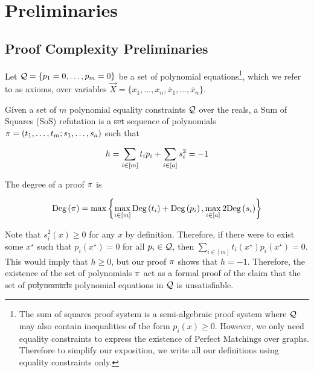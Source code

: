 \documentclass[11pt]{article}
\providecommand{\DIFadd}[1]{\textcolor{shin-ryoku}{#1}}%
\providecommand{\DIFdel}[1]{\textcolor{verylightgray}{\sout{#1}}}                      %
\providecommand{\DIFaddbegin}{} %
\providecommand{\DIFaddend}{} %
\providecommand{\DIFdelbegin}{} %
\providecommand{\DIFdelend}{} %
\begin{document}
\section{Preliminaries}
\label{sec:prelims}


\subsection{Proof Complexity Preliminaries}
\label{sec:proof-system-prelims}

Let $\mathcal{Q} = \{ p_1 = 0, \dots, p_m = 0\}$ be a set of polynomial equations\footnote{The sum of squares proof system is a semi-algebraic proof system where $\mathcal{Q}$ may also contain inequalities of the form $p_i(x) \ge 0$. 
However, we only need equality constraints to express the existence of Perfect Matchings over graphs. 
Therefore to simplify our exposition, we write all our definitions using equality constraints only.}, which we refer to as axioms, over variables $\vec{X} = \{x_1, \dots, x_n, \bar{x}_1, \dots, \bar{x}_n\}$.

\begin{definition}\label{def:sum-of-squares} 
Given a set of $m$ polynomial equality constraints $\mathcal{Q}$ over the reals, a Sum of Squares (SoS) refutation is a \DIFdelbegin \DIFdel{set }\DIFdelend \DIFaddbegin \DIFadd{sequence }\DIFaddend of polynomials $\pi = (t_1, \dots, t_m; s_1, \dots, s_a)$ such that

\[ h = \sum_{i \in [m]} t_ip_i+ \sum_{i \in [a]} s_i^2 = -1\]

The degree of a proof $\pi$ is

\[ \text{Deg}\left(\pi\right) = \max\left\{\max_{i \in [m]} \text{Deg}\left(t_i\right) + \text{Deg}\left(p_i\right), \max_{i \in [a]} 2\text{Deg}\left(s_i\right)\right\}\]

\end{definition}

Note that $s_i^2(x) \ge 0$ for any $x$ by definition. 
Therefore, if there were to exist some $x^{\star}$ such that $p_i(x^{\star}) = 0$ for all $p_i \in \mathcal{Q}$, then $\sum_{i \in [m]} t_i(x^\star)p_i(x^\star) = 0$. 
This would imply that $h \ge 0$, but our proof $\pi$ shows that $h = -1$. 
Therefore, the existence of the set of polynomials $\pi$ act as a formal proof of the claim that the set of \DIFdelbegin \DIFdel{polynomials }\DIFdelend \DIFaddbegin \DIFadd{polynomial }\DIFaddend equations in $\mathcal{Q}$ is unsatisfiable.
\DIFdelbegin %
\end{document}
